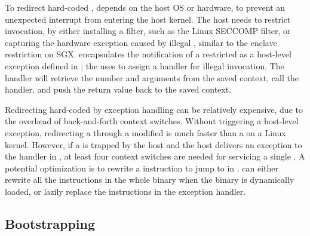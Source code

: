 

To redirect hard-coded \linuxapis{},
\thelibos{} depends on the host OS or hardware, to prevent an unexpected \linuxapi{} interrupt from entering the host kernel.
The host needs to restrict \linuxapi{} invocation,
by either installing a \linuxapi{} filter,
such as the Linux SECCOMP filter,
or capturing the hardware exception caused by illegal \linuxapis{},
similar to the enclave restriction on SGX.
\graphene{} encapsulates
the notification of a restricted \linuxapi{} as a host-level exception
defined in \thehostabi{};
\thelibos{} the uses 
to assign a handler for illegal \linuxapi{} invocation.
The handler will
retrieve the \linuxapi{} number and arguments
from the saved context,
call the \linuxapi{} handler,
and push the \linuxapi{} return value back to the saved context.



Redirecting hard-coded \linuxapis{} by exception handling
can be relatively expensive,
due to the overhead of back-and-forth context switches.
Without triggering a host-level exception,
redirecting a \linuxapi{} through a modified \libc{} is much faster than
a \linuxapi{} on a Linux kernel.
However, if a \linuxapi{} is trapped by the host
and the host delivers an exception to the handler in \thelibos{},
at least four context switches
are needed for servicing a single \linuxapi{}.
A potential optimization is to rewrite %
a  instruction
to jump to  in \thelibos{}.
\thelibos{} can either rewrite all the  instructions in
the whole binary when the binary is dynamically loaded,
or lazily replace the  instructions in the exception handler.










\subsection{Bootstrapping}


\thelibos{}



